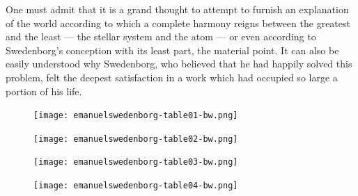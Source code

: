 \documentclass[a4paper, 11pt, oneside, polutonikogreek, english]{article}
\begin{document}
One must admit that it is a grand thought to attempt to furnish an explanation of the world according to which a complete harmony reigns between the greatest and the least --- the stellar system and the atom --- or even according to Swedenborg's conception with its least part, the material point. It can also be easily understood why Swedenborg, who believed that he had happily solved this problem, felt the deepest satisfaction in a work which had occupied so large a portion of his life.
\clearpage
\vspace*{\fill}
\begin{figure}[H]
\centering
\texttt{[image: emanuelswedenborg-table01-bw.png]}
\end{figure}
\vspace*{\fill}
\clearpage
\vspace*{\fill}
\begin{figure}[H]
\centering
\texttt{[image: emanuelswedenborg-table02-bw.png]}
\end{figure}
\vspace*{\fill}
\clearpage
\vspace*{\fill}
\begin{figure}[H]
\centering
\texttt{[image: emanuelswedenborg-table03-bw.png]}
\end{figure}
\vspace*{\fill}
\clearpage
\vspace*{\fill}
\begin{figure}[H]
\centering
\texttt{[image: emanuelswedenborg-table04-bw.png]}
\end{figure}
\vspace*{\fill}
\clearpage
\end{document}
